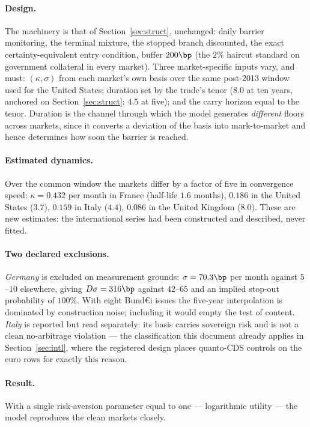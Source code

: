 \documentclass[11pt]{article}
\begin{document}
\paragraph{Design.} The machinery is that of Section~\ref{sec:struct}, unchanged: daily barrier
monitoring, the terminal mixture, the stopped branch discounted, the exact certainty-equivalent
entry condition, buffer $200\bp$ (the $2\%$ haircut standard on government collateral in every
market). Three market-specific inputs vary, and must: $(\kappa,\sigma)$ from each market's own
basis over the same post-2013 window used for the United States; duration set by the trade's tenor
($8.0$ at ten years, anchored on Section~\ref{sec:struct}; $4.5$ at five); and the carry horizon
equal to the tenor. Duration is the channel through which the model generates \emph{different}
floors across markets, since it converts a deviation of the basis into mark-to-market and hence
determines how soon the barrier is reached.

\paragraph{Estimated dynamics.} Over the common window the markets differ by a factor of five in
convergence speed: $\kappa=0.432$ per month in France (half-life $1.6$ months), $0.186$ in the
United States ($3.7$), $0.159$ in Italy ($4.4$), $0.086$ in the United Kingdom ($8.0$). These are
new estimates: the international series had been constructed and described, never fitted.

\paragraph{Two declared exclusions.} \emph{Germany} is excluded on measurement grounds:
$\sigma=70.3\bp$ per month against $5$--$10$ elsewhere, giving $D\sigma=316\bp$ against $42$--$65$
and an implied stop-out probability of $100\%$. With eight Bund\euro i issues the five-year
interpolation is dominated by construction noise; including it would empty the test of content.
\emph{Italy} is reported but read separately: its basis carries sovereign risk and is not a clean
no-arbitrage violation --- the classification this document already applies in
Section~\ref{sec:intl}, where the registered design places quanto-CDS controls on the euro rows for
exactly this reason.

\paragraph{Result.} With a single risk-aversion parameter equal to one --- logarithmic utility ---
the model reproduces the clean markets closely.
\end{document}
